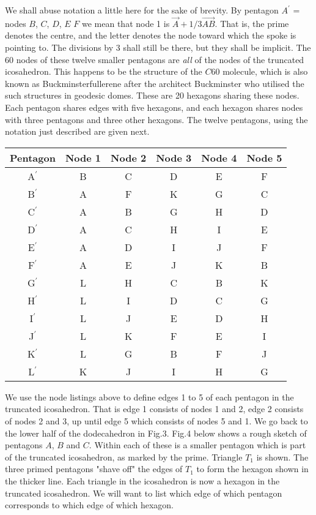 \documentclass[12pt]{article}
\begin{document}
We shall abuse notation a little here for the sake of brevity. By pentagon
$A^\prime$ = nodes $B$, $C$, $D$, $E$ $F$ we mean that node 1 is
 $\stackrel{\longrightarrow}{A}+1/3 \stackrel{\longrightarrow}{AB}$. That is, the
prime denotes the centre, and the letter denotes the node toward which the
spoke is pointing to. The divisions by 3 shall still be there, but they shall be
implicit. The 60 nodes of these twelve smaller pentagons are {\it all} of the nodes
of the truncated icosahedron. This happens to be the structure of the $C60$ molecule,
which is also known as Buckminsterfullerene after the architect Buckminster who
utilised the such structures in geodesic domes. These are 20 hexagons sharing these nodes. Each pentagon
shares edges with five hexagons, and each hexagon shares nodes with three pentagons
and three other hexagons.
The twelve pentagons, using the notation just described are given next.

\begin{center}
\begin{tabular}{| c | c | c | c | c | c |}
\hline
Pentagon &  Node 1& Node 2 & Node 3  & Node 4 & Node 5 \\
\hline
A$^\prime$ & B  & C & D & E & F \\
B$^\prime$ & A  & F & K & G & C \\
C$^\prime$ & A  & B & G & H & D \\
D$^\prime$ & A  & C & H & I & E \\
E$^\prime$ & A  & D & I & J & F \\
F$^\prime$ & A  & E & J & K & B \\
G$^\prime$ & L  & H & C & B & K \\
H$^\prime$ & L  & I & D & C & G \\
I$^\prime$ & L  & J & E & D & H \\
J$^\prime$ & L  & K & F & E & I \\
K$^\prime$ & L  & G & B & F & J \\
L$^\prime$ & K  & J & I & H & G \\
\hline
\end{tabular}
\end{center}

We use the node listings above to define edges 1 to 5 of each pentagon in the truncated icosahedron. That is
edge 1 consists of nodes 1 and 2, edge 2 consists of nodes 2 and 3, up until edge 5
which consists of nodes 5 and 1. We go back to the lower half of the dodecahedron in
Fig.3. Fig.4 below shows a rough sketch of pentagons $A$, $B$ and $C$. Within each
of these is a smaller pentagon which is part of the truncated icosahedron, as marked
by the prime. Triangle $T_1$ is shown. The three primed pentagons "shave off" the edges
of $T_1$ to form the hexagon shown in the thicker line. Each triangle in the icosahedron
is now a hexagon in the truncated icosahedron. We will want to list which edge
of which pentagon corresponds to which edge of which hexagon.
\end{document}
